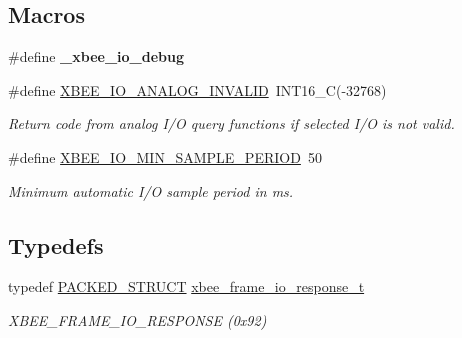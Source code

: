 \subsection*{Macros}
\begin{DoxyCompactItemize}
\item 
\mbox{\label{group__xbee__io_ga4bbb6c16a5af138ecfc8357d0675a5c4}} 
\#define {\bfseries \+\_\+xbee\+\_\+io\+\_\+debug}
\item 
\mbox{\label{group__xbee__io_ga196d5a808112b0c850b5b35c53b9cde1}} 
\#define \hyperlink{group__xbee__io_ga196d5a808112b0c850b5b35c53b9cde1}{X\+B\+E\+E\+\_\+\+I\+O\+\_\+\+A\+N\+A\+L\+O\+G\+\_\+\+I\+N\+V\+A\+L\+ID}~I\+N\+T16\+\_\+C(-\/32768)
\begin{DoxyCompactList}\small\item\em Return code from analog I/O query functions if selected I/O is not valid. \end{DoxyCompactList}\item 
\mbox{\label{group__xbee__io_ga0e8b4392a59ce754f75251d04f3a1ac3}} 
\#define \hyperlink{group__xbee__io_ga0e8b4392a59ce754f75251d04f3a1ac3}{X\+B\+E\+E\+\_\+\+I\+O\+\_\+\+M\+I\+N\+\_\+\+S\+A\+M\+P\+L\+E\+\_\+\+P\+E\+R\+I\+OD}~50
\begin{DoxyCompactList}\small\item\em Minimum automatic I/O sample period in ms. \end{DoxyCompactList}\end{DoxyCompactItemize}
\subsection*{Typedefs}
\begin{DoxyCompactItemize}
\item 
typedef \hyperlink{group___s_x_a_ga4233297bd31be5c273d4fb0758cc54d7}{P\+A\+C\+K\+E\+D\+\_\+\+S\+T\+R\+U\+CT} \hyperlink{group__xbee__io_ga91bd181d244760611d0c5292f12bced8}{xbee\+\_\+frame\+\_\+io\+\_\+response\+\_\+t}
\begin{DoxyCompactList}\small\item\em X\+B\+E\+E\+\_\+\+F\+R\+A\+M\+E\+\_\+\+I\+O\+\_\+\+R\+E\+S\+P\+O\+N\+SE (0x92) \end{DoxyCompactList}\end{DoxyCompactItemize}
